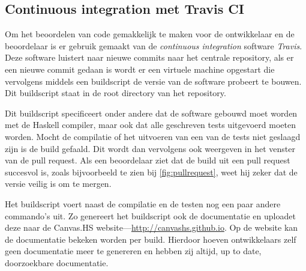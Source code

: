 \subsection{Continuous integration met Travis CI}

Om het beoordelen van code gemakkelijk te maken voor de ontwikkelaar en de beoordelaar is er gebruik gemaakt van de \emph{continuous integration} software \emph{Travis}. Deze software luistert naar nieuwe commits naar het centrale repository, als er een nieuwe commit gedaan is wordt er een virtuele machine opgestart die vervolgens middels een buildscript de versie van de software probeert te bouwen. Dit buildscript staat in de root directory van het repository.

Dit buildscript specificeert onder andere dat de software gebouwd moet worden met de Haskell compiler, maar ook dat alle geschreven tests uitgevoerd moeten worden. Mocht de compilatie of het uitvoeren van een van de tests niet geslaagd zijn is de build gefaald. Dit wordt dan vervolgens ook weergeven in het venster van de pull request. Als een beoordelaar ziet dat de build uit een pull request succesvol is, zoals bijvoorbeeld te zien bij \autoref{fig:pullrequest}, weet hij zeker dat de versie veilig is om te mergen.

Het buildscript voert naast de compilatie en de testen nog een paar andere commando's uit. Zo genereert het buildscript ook de documentatie en uploadet deze naar de Canvas.HS website—\url{http://canvashs.github.io}. Op de website kan de documentatie bekeken worden per build. Hierdoor hoeven ontwikkelaars zelf geen documentatie meer te genereren en hebben zij altijd, up to date, doorzoekbare documentatie.





